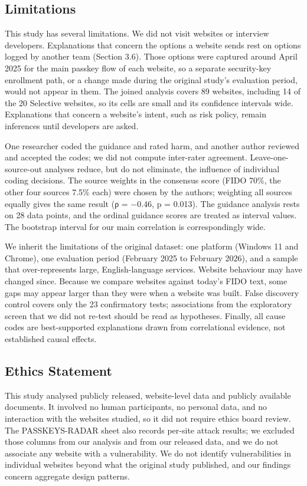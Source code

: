 \documentclass[letterpaper,twocolumn,10pt]{article}
\begin{document}
\subsection{Limitations}

This study has several limitations. We did not visit websites or interview developers. Explanations that concern the options a website sends rest on options logged by another team (Section 3.6). Those options were captured around April 2025 for the main passkey flow of each website, so a separate security-key enrollment path, or a change made during the original study's evaluation period, would not appear in them. The joined analysis covers 89 websites, including 14 of the 20 Selective websites, so its cells are small and its confidence intervals wide. Explanations that concern a website's intent, such as risk policy, remain inferences until developers are asked.

One researcher coded the guidance and rated harm, and another author reviewed and accepted the codes; we did not compute inter-rater agreement. Leave-one-source-out analyses reduce, but do not eliminate, the influence of individual coding decisions. The source weights in the consensus score (FIDO 70\%, the other four sources 7.5\% each) were chosen by the authors; weighting all sources equally gives the same result (ρ = −0.46, p = 0.013). The guidance analysis rests on 28 data points, and the ordinal guidance scores are treated as interval values. The bootstrap interval for our main correlation is correspondingly wide.

We inherit the limitations of the original dataset: one platform (Windows 11 and Chrome), one evaluation period (February 2025 to February 2026), and a sample that over-represents large, English-language services. Website behaviour may have changed since. Because we compare websites against today's FIDO text, some gaps may appear larger than they were when a website was built. False discovery control covers only the 23 confirmatory tests; associations from the exploratory screen that we did not re-test should be read as hypotheses. Finally, all cause codes are best-supported explanations drawn from correlational evidence, not established causal effects.

\subsection{Ethics Statement}

This study analysed publicly released, website-level data and publicly available documents. It involved no human participants, no personal data, and no interaction with the websites studied, so it did not require ethics board review. The PASSKEYS-RADAR sheet also records per-site attack results; we excluded those columns from our analysis and from our released data, and we do not associate any website with a vulnerability. We do not identify vulnerabilities in individual websites beyond what the original study published, and our findings concern aggregate design patterns.
\end{document}
